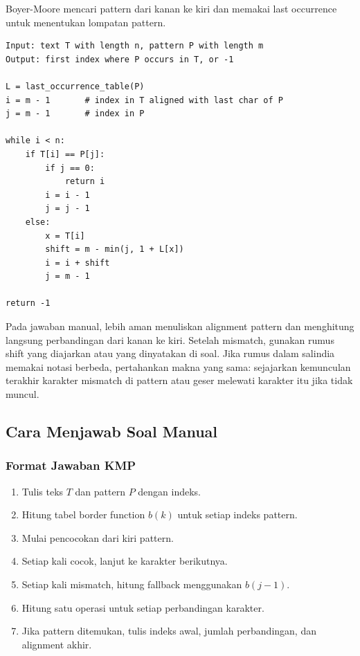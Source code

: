 \begin{jawab}
Boyer-Moore mencari pattern dari kanan ke kiri dan memakai last occurrence untuk menentukan lompatan pattern.
\end{jawab}

\begin{lstlisting}[caption={Pseudocode Boyer-Moore dengan character-jump}, label={lst:boyer-moore-string-matching}]
Input: text T with length n, pattern P with length m
Output: first index where P occurs in T, or -1

L = last_occurrence_table(P)
i = m - 1       # index in T aligned with last char of P
j = m - 1       # index in P

while i < n:
    if T[i] == P[j]:
        if j == 0:
            return i
        i = i - 1
        j = j - 1
    else:
        x = T[i]
        shift = m - min(j, 1 + L[x])
        i = i + shift
        j = m - 1

return -1
\end{lstlisting}

Pada jawaban manual, lebih aman menuliskan alignment pattern dan menghitung langsung perbandingan dari kanan ke kiri. Setelah mismatch, gunakan rumus shift yang diajarkan atau yang dinyatakan di soal. Jika rumus dalam salindia memakai notasi berbeda, pertahankan makna yang sama: sejajarkan kemunculan terakhir karakter mismatch di pattern atau geser melewati karakter itu jika tidak muncul.

\subsection{Cara Menjawab Soal Manual}

\subsubsection{Format Jawaban KMP}

\begin{enumerate}
    \item Tulis teks $T$ dan pattern $P$ dengan indeks.
    \item Hitung tabel border function $b(k)$ untuk setiap indeks pattern.
    \item Mulai pencocokan dari kiri pattern.
    \item Setiap kali cocok, lanjut ke karakter berikutnya.
    \item Setiap kali mismatch, hitung fallback menggunakan $b(j-1)$.
    \item Hitung satu operasi untuk setiap perbandingan karakter.
    \item Jika pattern ditemukan, tulis indeks awal, jumlah perbandingan, dan alignment akhir.
\end{enumerate}

